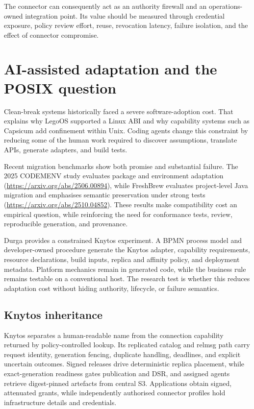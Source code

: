 The connector can consequently act as an authority firewall and an operations-
owned integration point. Its value should be measured through credential
exposure, policy review effort, reuse, revocation latency, failure isolation,
and the effect of connector compromise.

\section{AI-assisted adaptation and the POSIX question}

Clean-break systems historically faced a severe software-adoption cost. That
explains why LegoOS supported a Linux ABI and why capability systems such as
Capsicum add confinement within Unix. Coding agents change this constraint by
reducing some of the human work required to discover assumptions, translate
APIs, generate adapters, and build tests. 

Recent migration benchmarks show both promise and substantial failure. The
2025 CODEMENV study evaluates package and environment adaptation
(\url{https://arxiv.org/abs/2506.00894}), while FreshBrew evaluates project-level
Java migration and emphasises semantic preservation under strong tests
(\url{https://arxiv.org/abs/2510.04852}). These results make compatibility cost
an empirical question, while reinforcing the need for conformance tests,
review, reproducible generation, and provenance.

Durga provides a constrained Knytos experiment. A BPMN process model and
developer-owned procedure generate the Knytos adapter, capability
requirements, resource declarations, build inputs, replica and affinity
policy, and deployment metadata. Platform mechanics remain in generated code, while
the business rule remains testable on a conventional host. The research test
is whether this reduces adaptation cost without hiding authority, lifecycle,
or failure semantics.

\subsection{Knytos inheritance}

Knytos separates a human-readable name from the connection capability
returned by policy-controlled lookup. Its replicated catalog and relmsg path
carry request identity, generation fencing, duplicate handling, deadlines, and
explicit uncertain outcomes. Signed releases drive deterministic replica
placement, while exact-generation readiness gates publication and DSR, and assigned
agents retrieve digest-pinned artefacts from central S3. Applications obtain
signed, attenuated grants, while independently authorised connector profiles
hold infrastructure details and credentials.


